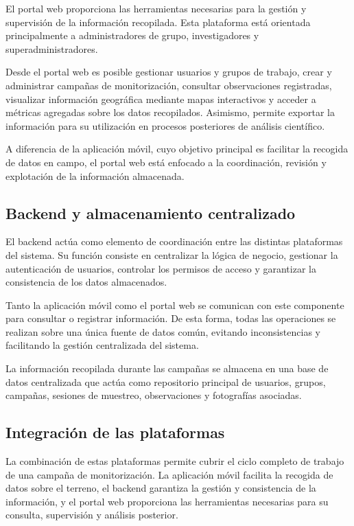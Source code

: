 El portal web proporciona las herramientas necesarias para la gestión y supervisión de la información recopilada. Esta plataforma está orientada principalmente a administradores de grupo, investigadores y superadministradores.

Desde el portal web es posible gestionar usuarios y grupos de trabajo, crear y administrar campañas de monitorización, consultar observaciones registradas, visualizar información geográfica mediante mapas interactivos y acceder a métricas agregadas sobre los datos recopilados. Asimismo, permite exportar la información para su utilización en procesos posteriores de análisis científico.

A diferencia de la aplicación móvil, cuyo objetivo principal es facilitar la recogida de datos en campo, el portal web está enfocado a la coordinación, revisión y explotación de la información almacenada.

\subsection{Backend y almacenamiento centralizado}

El backend actúa como elemento de coordinación entre las distintas plataformas del sistema. Su función consiste en centralizar la lógica de negocio, gestionar la autenticación de usuarios, controlar los permisos de acceso y garantizar la consistencia de los datos almacenados.

Tanto la aplicación móvil como el portal web se comunican con este componente para consultar o registrar información. De esta forma, todas las operaciones se realizan sobre una única fuente de datos común, evitando inconsistencias y facilitando la gestión centralizada del sistema.

La información recopilada durante las campañas se almacena en una base de datos centralizada que actúa como repositorio principal de usuarios, grupos, campañas, sesiones de muestreo, observaciones y fotografías asociadas.

\subsection{Integración de las plataformas}

La combinación de estas plataformas permite cubrir el ciclo completo de trabajo de una campaña de monitorización. La aplicación móvil facilita la recogida de datos sobre el terreno, el backend garantiza la gestión y consistencia de la información, y el portal web proporciona las herramientas necesarias para su consulta, supervisión y análisis posterior.

